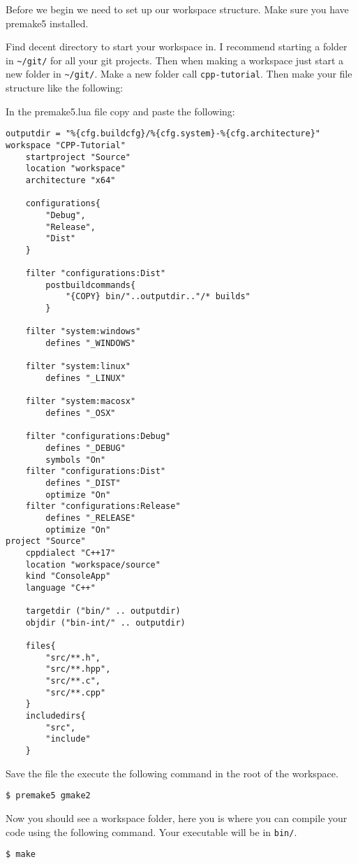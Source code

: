 \documentclass[10pt]{exam}
\begin{document}
Before we begin we need to set up our workspace structure. Make sure you have premake5 installed.

Find decent directory to start your workspace in. I recommend starting a folder in \lstinline{~/git/} for all your git projects. Then when making a workspace just start a new folder in \lstinline{~/git/}. Make a new folder call \lstinline{cpp-tutorial}. Then make your file structure like the following:


In the premake5.lua file copy and paste the following:

\begin{lstlisting}[language={[5.0]lua},basicstyle=\ttfamily\footnotesize,keywordstyle=\bfseries]
outputdir = "%{cfg.buildcfg}/%{cfg.system}-%{cfg.architecture}"
workspace "CPP-Tutorial"
	startproject "Source"
	location "workspace"
	architecture "x64"

	configurations{
		"Debug",
		"Release",
		"Dist"
	}

	filter "configurations:Dist"
		postbuildcommands{
			"{COPY} bin/"..outputdir.."/* builds"
		}

	filter "system:windows"
		defines "_WINDOWS"

	filter "system:linux"
		defines "_LINUX" 

	filter "system:macosx"
		defines "_OSX"

	filter "configurations:Debug"
		defines "_DEBUG"
		symbols "On"
	filter "configurations:Dist"
		defines "_DIST"
		optimize "On"
	filter "configurations:Release"
		defines "_RELEASE"
		optimize "On"
project "Source"
	cppdialect "C++17"
	location "workspace/source"
	kind "ConsoleApp"
	language "C++"

	targetdir ("bin/" .. outputdir)
	objdir ("bin-int/" .. outputdir)

	files{
		"src/**.h",
		"src/**.hpp",
		"src/**.c",
		"src/**.cpp"
	}
	includedirs{
		"src",
		"include"
	}
\end{lstlisting}

Save the file the execute the following command in the root of the workspace.

\begin{lstlisting}
$ premake5 gmake2
\end{lstlisting}

Now you should see a workspace folder, here you is where you can compile your code using the following command. Your executable will be in \lstinline{bin/}.
\begin{lstlisting}
$ make
\end{lstlisting}
\end{document}
